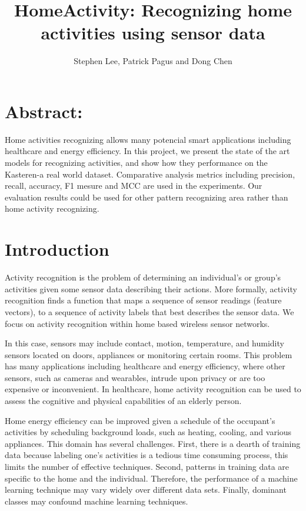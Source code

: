 \documentclass[11pt, oneside]{article}   	%
\title{HomeActivity: Recognizing home activities using sensor data}
\author{Stephen Lee, Patrick Pagus and Dong Chen}
\begin{document}
\maketitle
\section{Abstract:}
Home activities recognizing allows many potencial smart applications including healthcare and energy efficiency. In this project, we present the state of the art models for recognizing activities, and show how they performance on the Kasteren-a real world dataset. Comparative analysis metrics including precision, recall, accuracy, F1 mesure and MCC are used in the experiments. Our evaluation results could be used for other pattern recognizing area rather than home activity recognizing.

\section{Introduction}

Activity recognition is the problem of determining an individual's or group's activities given some sensor data describing their actions. More formally, activity recognition finds a function that maps a sequence of sensor readings (feature vectors), to a sequence of activity labels that best describes the sensor data. We focus on activity recognition within home based wireless sensor networks. 

In this case, sensors may include contact, motion, temperature, and humidity sensors located on doors, appliances or monitoring certain rooms. This problem has many applications including healthcare and energy efficiency, where other sensors, such as cameras and wearables, intrude upon privacy or are too expensive or inconvenient. In healthcare, home activity recognition can be used to assess the cognitive and physical capabilities of an elderly person. 

Home energy efficiency can be improved given a schedule of the occupant's activities by scheduling background loads, such as heating, cooling, and various appliances. This domain has several challenges. First, there is a dearth of training data because labeling one's activities is a tedious time consuming process, this limits the number of effective techniques. Second, patterns in training data are specific to the home and the individual. Therefore, the performance of a machine learning technique may vary widely over different data sets. Finally, dominant classes may confound machine learning techniques.
\end{document}
